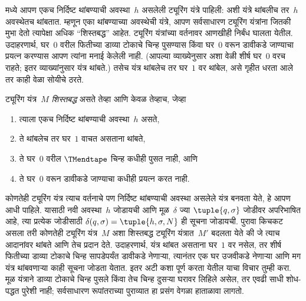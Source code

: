 \documentclass[../../../include/open-logic-section]{subfiles}
\begin{document}

\begin{explain}
 मध्ये आपण एकच निर्दिष्ट थांबण्याची अवस्था~$h$
असलेली ट्यूरिंग यंत्रे पाहिली: अशी यंत्रे थांबलीच तर~$h$
अवस्थेतच थांबतात. म्हणून एका थांबण्याच्या अवस्थेची यंत्रे, आपण
सर्वसाधारण ट्यूरिंग यंत्रांना जितकी मुभा देतो त्यापेक्षा अधिक
``शिस्तबद्ध'' आहेत. ट्यूरिंग यंत्रांच्या वर्तनावर आणखीही निर्बंध
घालता येतील. उदाहरणार्थ, घर~$0$ वरील फितीच्या डाव्या टोकाचे
चिन्ह पुसण्यास किंवा घर~$0$ वरून डावीकडे जाण्याचा प्रयत्न
करण्यास आपण त्यांना मनाई केलेली नाही. (आपल्या व्याख्येनुसार
अशा वेळी शीर्ष घर~$0$ वरच राहते; इतर व्याख्यांनुसार यंत्र
थांबते.) तसेच यंत्र थांबलेच तर घर~$1$ वर थांबेल, असे गृहीत
धरता आले तर काही वेळा सोयीचे ठरते.
\end{explain}

\begin{defn}
ट्यूरिंग यंत्र~$M$ \emph{शिस्तबद्ध} असते तेव्हा आणि केवळ तेव्हाच,
जेव्हा
\begin{enumerate}
    \item त्याला एकच निर्दिष्ट थांबण्याची अवस्था~$h$ असते,
    \item ते थांबलेच तर घर~$1$ वाचत असताना थांबते,
    \item ते घर~$0$ वरील $\TMendtape$ चिन्ह कधीही पुसत नाही, आणि
    \item ते घर~$0$ वरून डावीकडे जाण्याचा कधीही प्रयत्न करत नाही.
\end{enumerate}
\end{defn}

\begin{explain}
कोणतेही ट्यूरिंग यंत्र त्याच वर्तनाचे पण निर्दिष्ट थांबण्याची
अवस्था असलेले यंत्र बनवता येते, हे आपण आधी पाहिले. यासाठी
नवी अवस्था~$h$ जोडायची आणि मूळ~$\delta$ ज्या
$\tuple{q,\sigma}$ जोडीवर अपरिभाषित आहे, त्या प्रत्येक जोडीसाठी
$\delta(q, \sigma) = \tuple{h, \sigma, N}$ ही सूचना जोडायची.
पुरावा किचकट असला तरी कोणतेही ट्यूरिंग यंत्र~$M$ अशा
शिस्तबद्ध ट्यूरिंग यंत्रात~$M'$ बदलता येते की जे त्याच आदानांवर
थांबते आणि तेच प्रदान देते. उदाहरणार्थ, यंत्र थांबत असताना
घर~$1$ वर नसेल, तर शीर्ष फितीच्या डाव्या टोकाचे चिन्ह सापडेपर्यंत
डावीकडे नेणाऱ्या, त्यानंतर एक घर उजवीकडे नेणाऱ्या आणि मग यंत्र
थांबवणाऱ्या काही सूचना जोडता येतात. इतर अटी कशा पूर्ण करता
येतील याचा विचार तुम्ही करा.
मूळ यंत्राने डाव्या टोकाचे चिन्ह पुसले किंवा तेच चिन्ह दुसऱ्या घरावर
लिहिले असेल, तर एवढी साधी शोध-पद्धत पुरेशी नाही; सर्वसाधारण
रूपांतराच्या पुराव्यात हा प्रसंग वेगळा हाताळावा लागतो.
%
\end{explain}
\end{document}
